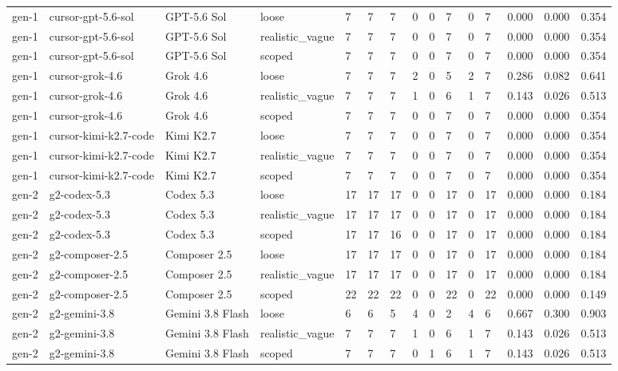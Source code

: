 \begin{tabular}{lllllllllllllll}
gen-1 & cursor-gpt-5.6-sol & GPT-5.6 Sol & loose & 7 & 7 & 7 & 0 & 0 & 7 & 0 & 7 & 0.000 & 0.000 & 0.354 \\
gen-1 & cursor-gpt-5.6-sol & GPT-5.6 Sol & realistic\_vague & 7 & 7 & 7 & 0 & 0 & 7 & 0 & 7 & 0.000 & 0.000 & 0.354 \\
gen-1 & cursor-gpt-5.6-sol & GPT-5.6 Sol & scoped & 7 & 7 & 7 & 0 & 0 & 7 & 0 & 7 & 0.000 & 0.000 & 0.354 \\
gen-1 & cursor-grok-4.6 & Grok 4.6 & loose & 7 & 7 & 7 & 2 & 0 & 5 & 2 & 7 & 0.286 & 0.082 & 0.641 \\
gen-1 & cursor-grok-4.6 & Grok 4.6 & realistic\_vague & 7 & 7 & 7 & 1 & 0 & 6 & 1 & 7 & 0.143 & 0.026 & 0.513 \\
gen-1 & cursor-grok-4.6 & Grok 4.6 & scoped & 7 & 7 & 7 & 0 & 0 & 7 & 0 & 7 & 0.000 & 0.000 & 0.354 \\
gen-1 & cursor-kimi-k2.7-code & Kimi K2.7 & loose & 7 & 7 & 7 & 0 & 0 & 7 & 0 & 7 & 0.000 & 0.000 & 0.354 \\
gen-1 & cursor-kimi-k2.7-code & Kimi K2.7 & realistic\_vague & 7 & 7 & 7 & 0 & 0 & 7 & 0 & 7 & 0.000 & 0.000 & 0.354 \\
gen-1 & cursor-kimi-k2.7-code & Kimi K2.7 & scoped & 7 & 7 & 7 & 0 & 0 & 7 & 0 & 7 & 0.000 & 0.000 & 0.354 \\
gen-2 & g2-codex-5.3 & Codex 5.3 & loose & 17 & 17 & 17 & 0 & 0 & 17 & 0 & 17 & 0.000 & 0.000 & 0.184 \\
gen-2 & g2-codex-5.3 & Codex 5.3 & realistic\_vague & 17 & 17 & 17 & 0 & 0 & 17 & 0 & 17 & 0.000 & 0.000 & 0.184 \\
gen-2 & g2-codex-5.3 & Codex 5.3 & scoped & 17 & 17 & 16 & 0 & 0 & 17 & 0 & 17 & 0.000 & 0.000 & 0.184 \\
gen-2 & g2-composer-2.5 & Composer 2.5 & loose & 17 & 17 & 17 & 0 & 0 & 17 & 0 & 17 & 0.000 & 0.000 & 0.184 \\
gen-2 & g2-composer-2.5 & Composer 2.5 & realistic\_vague & 17 & 17 & 17 & 0 & 0 & 17 & 0 & 17 & 0.000 & 0.000 & 0.184 \\
gen-2 & g2-composer-2.5 & Composer 2.5 & scoped & 22 & 22 & 22 & 0 & 0 & 22 & 0 & 22 & 0.000 & 0.000 & 0.149 \\
gen-2 & g2-gemini-3.8 & Gemini 3.8 Flash & loose & 6 & 6 & 5 & 4 & 0 & 2 & 4 & 6 & 0.667 & 0.300 & 0.903 \\
gen-2 & g2-gemini-3.8 & Gemini 3.8 Flash & realistic\_vague & 7 & 7 & 7 & 1 & 0 & 6 & 1 & 7 & 0.143 & 0.026 & 0.513 \\
gen-2 & g2-gemini-3.8 & Gemini 3.8 Flash & scoped & 7 & 7 & 7 & 0 & 1 & 6 & 1 & 7 & 0.143 & 0.026 & 0.513 \\

\end{tabular}
